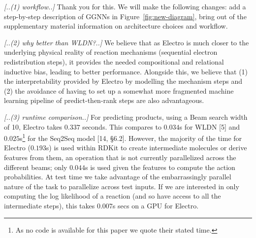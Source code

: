 \documentclass{article}
\begin{document}
\emph{[..(1) workflow..]}
Thank you for this. We will make the following changes: add a step-by-step description of GGNNs in Figure~\ref{fig:new-diagram}, bring out of the supplementary material information on architecture choices and workflow. 

\emph{[..(2) why better than WLDN?..]}
We believe that as Electro is much closer to the underlying physical reality of reaction mechanisms (sequential electron redistribution steps), it provides the needed compositional and relational inductive bias, leading to better performance.
 Alongside this, we believe that (1) the interpretability provided by Electro by modelling the mechanism steps and (2) the avoidance of having to set up a somewhat more fragmented machine learning pipeline of predict-then-rank steps are also advantageous.%

\emph{[..(3) runtime comparison..]}
For predicting products, using a Beam search width of 10, Electro takes $0.337$ seconds. This compares to $0.034$s for WLDN [5] and $0.025$s\footnote{As no code is available for this paper we quote their stated time.} for the Seq2Seq model [14, \S6.2]. 
 However, the majority of the time for Electro ($0.193$s) is used within RDKit to create intermediate molecules or derive features from them, an operation that is not currently parallelized across the different beams; only $0.044$s is used given the features to compute the action probabilities.
  At test time we take advantage of the embarrassingly parallel nature of the task to parallelize across test inputs. 
   If we are interested in only computing the log likelihood of a reaction (and so have access to all the intermediate steps), this takes $0.007$s secs on a GPU for Electro. 
\end{document}

